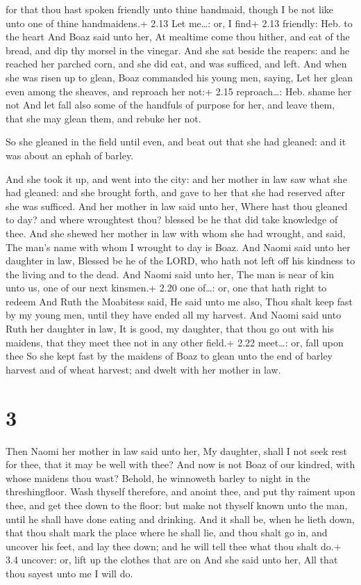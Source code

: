 for that thou hast spoken friendly unto thine handmaid, though I be not
like unto one of thine handmaidens.+ 2.13 Let me\ldots: or, I find+ 2.13
friendly: Heb. to the heart  And Boaz said unto her, At
mealtime come thou hither, and eat of the bread, and dip thy morsel in
the vinegar. And she sat beside the reapers: and he reached her parched
corn, and she did eat, and was sufficed, and left.  And
when she was risen up to glean, Boaz commanded his young men, saying,
Let her glean even among the sheaves, and reproach her not:+ 2.15
reproach\ldots: Heb. shame her not  And let fall also some
of the handfuls of purpose for her, and leave them, that she may glean
them, and rebuke her not.

 So she gleaned in the field until even, and beat out that
she had gleaned: and it was about an ephah of barley.

 And she took it up, and went into the city: and her
mother in law saw what she had gleaned: and she brought forth, and gave
to her that she had reserved after she was sufficed.  And
her mother in law said unto her, Where hast thou gleaned to day? and
where wroughtest thou? blessed be he that did take knowledge of thee.
And she shewed her mother in law with whom she had wrought, and said,
The man's name with whom I wrought to day is Boaz.  And
Naomi said unto her daughter in law, Blessed be he of the LORD, who hath
not left off his kindness to the living and to the dead. And Naomi said
unto her, The man is near of kin unto us, one of our next kinsmen.+ 2.20
one of\ldots: or, one that hath right to redeem  And Ruth
the Moabitess said, He said unto me also, Thou shalt keep fast by my
young men, until they have ended all my harvest.  And Naomi
said unto Ruth her daughter in law, It is good, my daughter, that thou
go out with his maidens, that they meet thee not in any other field.+
2.22 meet\ldots: or, fall upon thee  So she kept fast by
the maidens of Boaz to glean unto the end of barley harvest and of wheat
harvest; and dwelt with her mother in law.

\hypertarget{section-2}{%
\section{3}\label{section-2}}

 Then Naomi her mother in law said unto her, My daughter,
shall I not seek rest for thee, that it may be well with thee?
 And now is not Boaz of our kindred, with whose maidens thou
wast? Behold, he winnoweth barley to night in the threshingfloor.
 Wash thyself therefore, and anoint thee, and put thy
raiment upon thee, and get thee down to the floor: but make not thyself
known unto the man, until he shall have done eating and drinking.
 And it shall be, when he lieth down, that thou shalt mark
the place where he shall lie, and thou shalt go in, and uncover his
feet, and lay thee down; and he will tell thee what thou shalt do.+ 3.4
uncover: or, lift up the clothes that are on  And she said
unto her, All that thou sayest unto me I will do.

